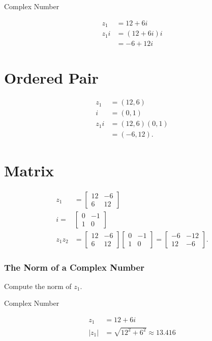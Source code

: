 Complex Number

$$
\begin{aligned}
z_{1} & =12+6 i \\
z_{1} i & =(12+6 i) i \\
& =-6+12 i
\end{aligned}
$$

\section{Ordered Pair}
$$
\begin{aligned}
z_{1} & =(12,6) \\
i & =(0,1) \\
z_{1} i & =(12,6)(0,1) \\
& =(-6,12) .
\end{aligned}
$$

\section{Matrix}
$$
\begin{aligned}
z_{1} & =\left[\begin{array}{cc}
12 & -6 \\
6 & 12
\end{array}\right] \\
i= & {\left[\begin{array}{cc}
0 & -1 \\
1 & 0
\end{array}\right] } \\
z_{1} z_{2} & =\left[\begin{array}{cc}
12 & -6 \\
6 & 12
\end{array}\right]\left[\begin{array}{cc}
0 & -1 \\
1 & 0
\end{array}\right]=\left[\begin{array}{cc}
-6 & -12 \\
12 & -6
\end{array}\right] .
\end{aligned}
$$

\subsubsection{The Norm of a Complex Number}
Compute the norm of $z_{1}$.

Complex Number

$$
\begin{aligned}
z_{1} & =12+6 i \\
\left|z_{1}\right| & =\sqrt{12^{2}+6^{2}} \approx 13.416
\end{aligned}
$$

